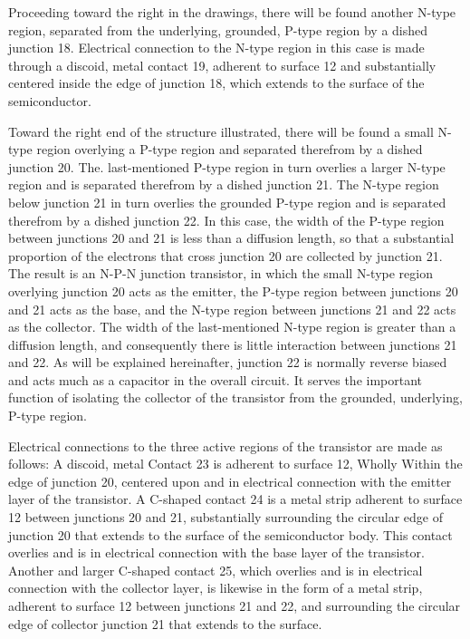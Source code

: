 Proceeding toward the right in the drawings, there will be found another N-type region, separated from the underlying, grounded, P-type region by a dished junction 18. Electrical connection to the N-type region in this case is made through a discoid, metal contact 19, adherent to surface 12 and substantially centered inside the edge of junction 18, which extends to the surface of the semiconductor.

Toward the right end of the structure illustrated, there will be found a small N-type region overlying a P-type region and separated therefrom by a dished junction 20. The. last-mentioned P-type region in turn overlies a larger N-type region and is separated therefrom by a dished junction 21. The N-type region below junction 21 in turn overlies the grounded P-type region and is separated therefrom by a dished junction 22. In this case, the width of the P-type region between junctions 20 and 21 is less than a diffusion length, so that a substantial proportion of the electrons that cross junction 20 are collected by junction 21. The result is an N-P-N junction transistor, in which the small N-type region overlying junction 20 acts as the emitter, the P-type region between junctions 20 and 21 acts as the base, and the N-type region between junctions 21 and 22 acts as the collector. The width of the last-mentioned N-type region is greater than a diffusion length, and consequently there is little interaction between junctions 21 and 22. As will be explained hereinafter, junction 22 is normally reverse biased and acts much as a capacitor in the overall circuit. It serves the important function of isolating the collector of the transistor from the grounded, underlying, P-type region.

Electrical connections to the three active regions of the transistor are made as follows: A discoid, metal Contact 23 is adherent to surface 12, Wholly Within the edge of junction 20, centered upon and in electrical connection with the emitter layer of the transistor. A C-shaped contact 24 is a metal strip adherent to surface 12 between junctions 20 and 21, substantially surrounding the circular edge of junction 20 that extends to the surface of the semiconductor body. This contact overlies and is in electrical connection with the base layer of the transistor. Another and larger C-shaped contact 25, which overlies and is in electrical connection with the collector layer, is likewise in the form of a metal strip, adherent to surface 12 between junctions 21 and 22, and surrounding the circular edge of collector junction 21 that extends to the surface.

